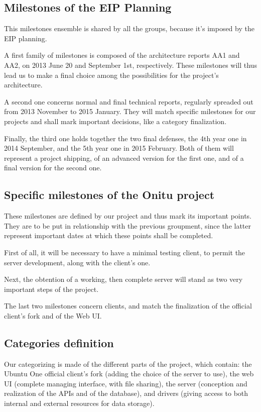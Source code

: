\subsection{Milestones of the EIP Planning}

This milestones ensemble is shared by all the groups, because it's imposed by the EIP planning.


A first family of milestones is composed of the architecture reports AA1 and AA2, on 2013 June 20 and September 1st, respectively. These milestones will thus lead us to make a final choice among the possibilities for the project's architecture.

A second one concerns normal and final technical reports, regularly spreaded out from 2013 November to 2015 January. They will match specific milestones for our projects and shall mark important decisions, like a category finalization.

Finally, the third one holds together the two final defenses, the 4th year one in 2014 September, and the 5th year one in 2015 February. Both of them will represent a project shipping, of an advanced version for the first one, and of a final version for the second one.


\subsection{Specific milestones of the Onitu project}

These milestones are defined by our project and thus mark its important points. They are to be put in relationship with the previous groupment, since the latter represent important dates at which these points shall be completed.


First of all, it will be necessary to have a minimal testing client, to permit the server development, along with the client's one.

Next, the obtention of a working, then complete server will stand as two very important steps of the project.

The last two milestones concern clients, and match the finalization of the official client's fork and of the Web UI.


\subsection{Categories definition}

Our categorizing is made of the different parts of the project, which contain: the Ubuntu One official client's fork (adding the choice of the server to use), the web UI (complete managing interface, with file sharing), the server (conception and realization of the APIs and of the database), and drivers (giving access to both internal and external resources for data storage).